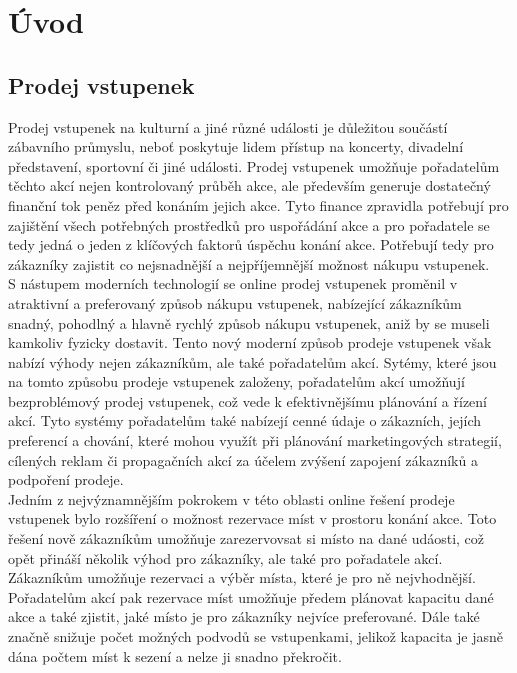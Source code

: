 \chapter*{Úvod}

\section*{Prodej vstupenek}
\label{sec:uvod-prodej-vstupenek}
Prodej vstupenek na kulturní a jiné různé události je důležitou součástí zábavního průmyslu, neboť poskytuje lidem přístup na koncerty, divadelní představení, sportovní či jiné události. Prodej vstupenek umožňuje pořadatelům těchto akcí nejen kontrolovaný průběh akce, ale především generuje dostatečný finanční tok peněz před konáním jejich akce. Tyto finance zpravidla potřebují pro zajištění všech potřebných prostředků pro uspořádání akce a pro pořadatele se tedy jedná o jeden z klíčových faktorů úspěchu konání akce. Potřebují tedy pro zákazníky zajistit co nejsnadnější a nejpříjemnější možnost nákupu vstupenek.\\

S nástupem moderních technologií se online prodej vstupenek proměnil v atraktivní a preferovaný způsob nákupu vstupenek, nabízející zákazníkům snadný, pohodlný a hlavně rychlý způsob nákupu vstupenek, aniž by se museli kamkoliv fyzicky dostavit. Tento nový moderní způsob prodeje vstupenek však nabízí výhody nejen zákazníkům, ale také pořadatelům akcí. Sytémy, které jsou na tomto způsobu prodeje vstupenek založeny, pořadatelům akcí umožňují bezproblémový prodej vstupenek, což vede k efektivnějšímu plánování a řízení akcí. Tyto systémy pořadatelům také nabízejí cenné údaje o zákazních, jejích preferencí a chování, které mohou využít při plánování marketingových strategií, cílených reklam či propagačních akcí za účelem zvýšení zapojení zákazníků a podpoření prodeje.\\

Jedním z nejvýznamnějším pokrokem v této oblasti online řešení prodeje vstupenek bylo rozšíření o možnost rezervace míst v prostoru konání akce. Toto řešení nově zákazníkům umožňuje zarezervovsat si místo na dané udáosti, což opět přináší několik výhod pro zákazníky, ale také pro pořadatele akcí. Zákazníkům umožňuje rezervaci a výběr místa, které je pro ně nejvhodnější. Pořadatelům akcí pak rezervace míst umožňuje předem plánovat kapacitu dané akce a také zjistit, jaké místo je pro zákazníky nejvíce preferované. Dále také značně snižuje počet možných podvodů se vstupenkami, jelikož kapacita je jasně dána počtem míst k sezení a nelze ji snadno překročit.\\

